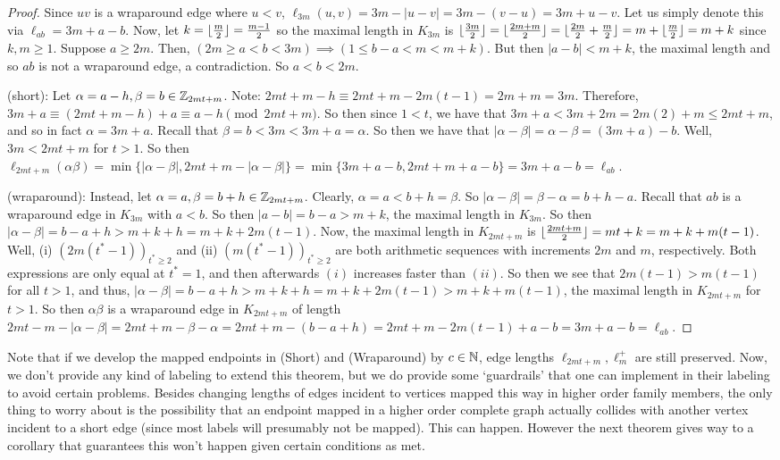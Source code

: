 \begin{proof}
Since $uv$ is a wraparound edge where $u<v$, $\ell_{3m}(u,v)=3m-|u-v|=3m-(v-u)=3m+u-v$. Let us simply denote this via $\ell_{ab}=3m+a-b$. Now, let $k=\lfloor\frac{m}{2}\rfloor=\frac{m-1}{2}$ so the maximal length in $K_{3m}$ is $\lfloor\frac{3m}{2}\rfloor=\lfloor\frac{2m+m}{2}\rfloor=\lfloor\frac{2m}{2}+\frac{m}{2}\rfloor=m+\lfloor\frac{m}{2}\rfloor=m+k$ since $k,m\geq 1$. Suppose $a\geq 2m$. Then, $(2m\geq a<b<3m)\implies (1\leq b-a<m<m+k).$ But then $|a-b|<m+k$, the maximal length and so $ab$ is not a wraparound edge, a contradiction. So $a<b<2m$.\newline

\noindent (short): Let $\alpha= a-h,\beta=b\in \mathbb{Z}_{2mt+m}$. Note: $2mt+m-h\equiv 2mt+m-2m(t-1)=2m+m=3m$. Therefore, $3m+a\equiv (2mt+m-h)+a\equiv a-h \pmod{2mt+m}$. So then since $1<t$, we have that $3m+a<3m+2m=2m(2)+m\leq 2mt+m$, and so in fact $\alpha = 3m+a$. Recall that $\beta=b<3m<3m+a=\alpha$. So then we have that $|\alpha-\beta|=\alpha-\beta=(3m+a)-b$. Well, $3m<2mt+m$ for $t>1$. So then $\ell_{2mt+m}(\alpha\beta)=\min\{|\alpha-\beta|,2mt+m-|\alpha-\beta|\}=\min\{3m+a-b, 2mt+m+a-b\}=3m+a-b=\ell_{ab}$.\newline

\noindent (wraparound): Instead, let $\alpha =a,\beta=b+h\in \mathbb{Z}_{2mt+m}$. Clearly, $\alpha=a<b+h=\beta$. So $|\alpha-\beta|=\beta-\alpha=b+h-a$. Recall that $ab$ is a wraparound edge in $K_{3m}$ with $a<b$. So then $|a-b|=b-a>m+k$, the maximal length in $K_{3m}$. So then $|\alpha-\beta|=b-a+h>m+k+h=m+k+2m(t-1)$. Now, the maximal length in $K_{2mt+m}$ is $\lfloor\frac{2mt+m}{2}\rfloor=mt+k=m+k+m(t-1)$. Well, (i) $(2m(t^{*}-1))_{t^{*}\geq 2}$ and (ii) $(m(t^{*}-1))_{t^{*}\geq 2}$ are both arithmetic sequences with increments $2m$ and $m$, respectively. Both expressions are only equal at $t^{*}=1$, and then afterwards $(i)$ increases faster than $(ii)$. So then we see that $2m(t-1)>m(t-1)$ for all $t>1$, and thus, $|\alpha-\beta|=b-a+h>m+k+h=m+k+2m(t-1)>m+k+m(t-1)$, the maximal length in $K_{2mt+m}$ for $t>1$. So then $\alpha\beta$ is a wraparound edge in $K_{2mt+m}$ of length $2mt-m-|\alpha-\beta|=2mt+m-\beta-\alpha=2mt+m - (b-a+h)= 2mt+m-2m(t-1)+a-b=3m+a-b=\ell_{ab}$.

\end{proof}
Note that if we develop the mapped endpoints in (Short) and (Wraparound) by $c\in \mathbb{N}$, edge lengths $\ell_{2mt+m},\ell_{m}^{+}$ are still preserved. Now, we don't provide any kind of labeling to extend this theorem, but we do provide some `guardrails' that one can implement in their labeling to avoid certain problems. Besides changing lengths of edges incident to vertices mapped this way in higher order family members, the only thing to worry about is the possibility that an endpoint mapped in a higher order complete graph actually collides with another vertex incident to a short edge (since most labels will presumably not be mapped). This can happen. However the next theorem gives way to a corollary that guarantees this won't happen given certain conditions as met.\newline

